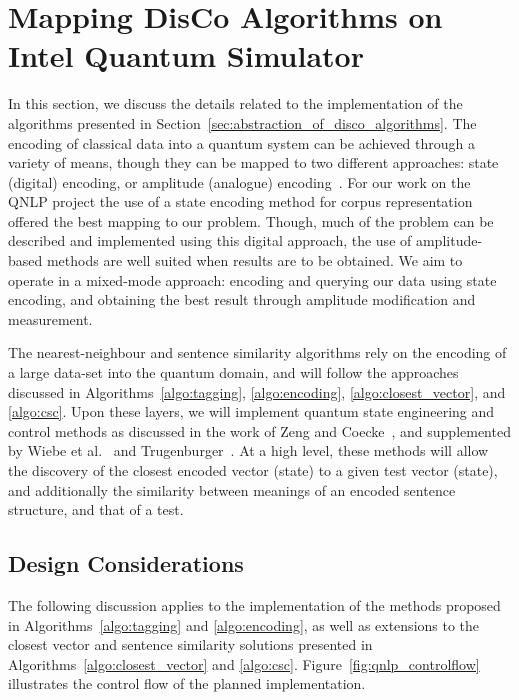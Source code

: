 \section{Mapping DisCo Algorithms on Intel Quantum Simulator}
\label{sec:mapping_disco_algorithms_on_intel_quantum_simulator}
In this section, we discuss the details related to the implementation of the algorithms presented in Section~\ref{sec:abstraction_of_disco_algorithms}. The encoding of classical data into a quantum system can be achieved through a variety of means, though they can be mapped to two different approaches: state (digital) encoding, or amplitude (analogue) encoding~\cite{Schuld_2017,Mitarai_Kitagawa_Fujii_2019}. For our work on the QNLP project the use of a state encoding method for corpus representation offered the best mapping to our problem. Though, much of the problem can be described and implemented using this digital approach, the use of amplitude-based methods are well suited when results are to be obtained. We aim to operate in a mixed-mode approach: encoding and querying our data using state encoding, and obtaining the best result through amplitude modification and measurement.

The nearest-neighbour and sentence similarity algorithms rely on the encoding of a large data-set into the quantum domain, and will follow the approaches discussed in Algorithms~\ref{algo:tagging}, \ref{algo:encoding}, \ref{algo:closest_vector}, and \ref{algo:csc}. Upon these layers, we will implement quantum state engineering and control methods as discussed in the work of Zeng and Coecke~\cite{Zeng_Coecke_2016}, and supplemented by Wiebe et al.~\cite{Wiebe_Kapoor_Svore_2014} and Trugenburger~\cite{Trugenberger_2001,Trugenberger_2002}. At a high level, these methods will allow the discovery of the closest encoded vector (state) to a given test vector (state), and additionally the similarity between meanings of an encoded sentence structure, and that of a test.


\subsection{Design Considerations}
\label{sec:design_considerations}
The following discussion applies to the implementation of the methods proposed in Algorithms~\ref{algo:tagging} and \ref{algo:encoding}, as well as extensions to the closest vector and sentence similarity solutions presented in Algorithms~\ref{algo:closest_vector} and \ref{algo:csc}. Figure~\ref{fig:qnlp_controlflow} illustrates the control flow of the planned implementation.


